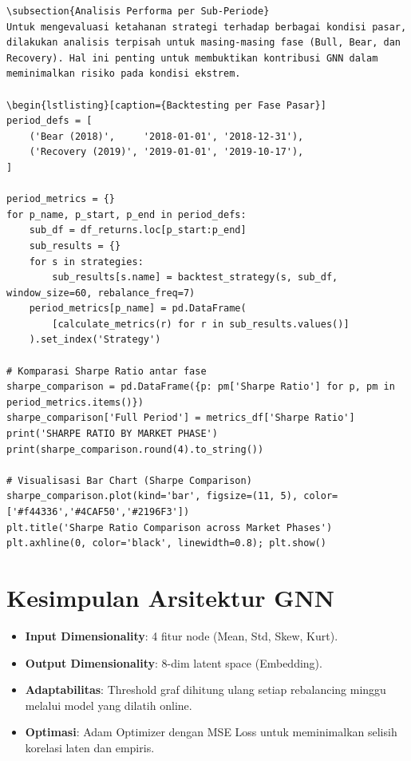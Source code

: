 \documentclass[12pt,a4paper]{article}
\begin{document}
\begin{lstlisting}[caption={Komputasi Matriks DM Test}]
\subsection{Analisis Performa per Sub-Periode}
Untuk mengevaluasi ketahanan strategi terhadap berbagai kondisi pasar, dilakukan analisis terpisah untuk masing-masing fase (Bull, Bear, dan Recovery). Hal ini penting untuk membuktikan kontribusi GNN dalam meminimalkan risiko pada kondisi ekstrem.

\begin{lstlisting}[caption={Backtesting per Fase Pasar}]
period_defs = [
    ('Bear (2018)',     '2018-01-01', '2018-12-31'),
    ('Recovery (2019)', '2019-01-01', '2019-10-17'),
]

period_metrics = {}
for p_name, p_start, p_end in period_defs:
    sub_df = df_returns.loc[p_start:p_end]
    sub_results = {}
    for s in strategies:
        sub_results[s.name] = backtest_strategy(s, sub_df, window_size=60, rebalance_freq=7)
    period_metrics[p_name] = pd.DataFrame(
        [calculate_metrics(r) for r in sub_results.values()]
    ).set_index('Strategy')

# Komparasi Sharpe Ratio antar fase
sharpe_comparison = pd.DataFrame({p: pm['Sharpe Ratio'] for p, pm in period_metrics.items()})
sharpe_comparison['Full Period'] = metrics_df['Sharpe Ratio']
print('SHARPE RATIO BY MARKET PHASE')
print(sharpe_comparison.round(4).to_string())

# Visualisasi Bar Chart (Sharpe Comparison)
sharpe_comparison.plot(kind='bar', figsize=(11, 5), color=['#f44336','#4CAF50','#2196F3'])
plt.title('Sharpe Ratio Comparison across Market Phases')
plt.axhline(0, color='black', linewidth=0.8); plt.show()
\end{lstlisting}



\section{Kesimpulan Arsitektur GNN}

\begin{itemize}
    \item \textbf{Input Dimensionality}: 4 fitur node (Mean, Std, Skew, Kurt).
    \item \textbf{Output Dimensionality}: 8-dim latent space (Embedding).
    \item \textbf{Adaptabilitas}: Threshold graf dihitung ulang setiap rebalancing minggu melalui model yang dilatih online.
    \item \textbf{Optimasi}: Adam Optimizer dengan MSE Loss untuk meminimalkan selisih korelasi laten dan empiris.
\end{itemize}
\end{document}
